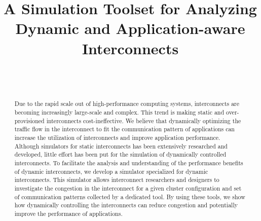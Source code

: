 \documentclass[conference]{IEEEtran}
\begin{document}
\title{A Simulation Toolset for Analyzing Dynamic and Application-aware Interconnects}

\author{%
     \\
     \\
}

\maketitle

\begin{abstract}
    Due to the rapid scale out of high-performance computing systems,
    interconnects are becoming increasingly large-scale and complex. This
    trend is making static and over-provisioned interconnects
    cost-ineffective. We believe that dynamically optimizing the traffic flow
    in the interconnect to fit the communication pattern of applications can
    increase the utilization of interconnects and improve application
    performance. Although simulators for static interconnects has been
    extensively researched and developed, little effort has been put for the
    simulation of dynamically controlled interconnects. To facilitate the
    analysis and understanding of the performance benefits of dynamic
    interconnects, we develop a simulator specialized for dynamic
    interconnects. This simulator allows interconnect researchers and
    designers to investigate the congestion in the interconnect for a given
    cluster configuration and set of communication patterns collected by a
    dedicated tool. By using these tools, we show how dynamically controlling
    the  interconnects can reduce congestion and potentially improve the
    performance of applications.
\end{abstract}
\end{document}
